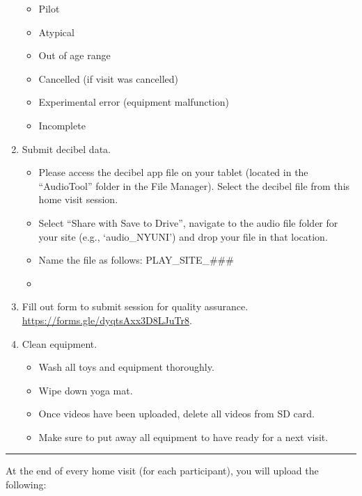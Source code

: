 \documentclass[
  12pt,
]{book}
\providecommand{\tightlist}{%
  \setlength{\itemsep}{0pt}\setlength{\parskip}{0pt}}
\begin{document}
\begin{enumerate}
  \begin{itemize}
  \tightlist
  \item
    Pilot
  \item
    Atypical
  \item
    Out of age range
  \item
    Cancelled (if visit was cancelled)
  \item
    Experimental error (equipment malfunction)
  \item
    Incomplete
  \end{itemize}
\item
  Submit decibel data.

  \begin{itemize}
  \tightlist
  \item
    Please access the decibel app file on your tablet (located in the ``AudioTool'' folder in the File Manager). Select the decibel file from this home visit session.
  \item
    Select ``Share with Save to Drive'', navigate to the audio file folder for your site (e.g., `audio\_NYUNI') and drop your file in that location.
  \item
    Name the file as follows: PLAY\_SITE\_\#\#\#
  \item
  \end{itemize}
\item
  Fill out form to submit session for quality assurance. \url{https://forms.gle/dyqtsAxx3D8LJuTr8}.
\item
  Clean equipment.

  \begin{itemize}
  \tightlist
  \item
    Wash all toys and equipment thoroughly.
  \item
    Wipe down yoga mat.
  \item
    Once videos have been uploaded, delete all videos from SD card.
  \item
    Make sure to put away all equipment to have ready for a next visit.
  \end{itemize}
\end{enumerate}

\begin{center}\rule{0.5\linewidth}{0.5pt}\end{center}

At the end of every home visit (for each participant), you will upload the following:
\end{document}
